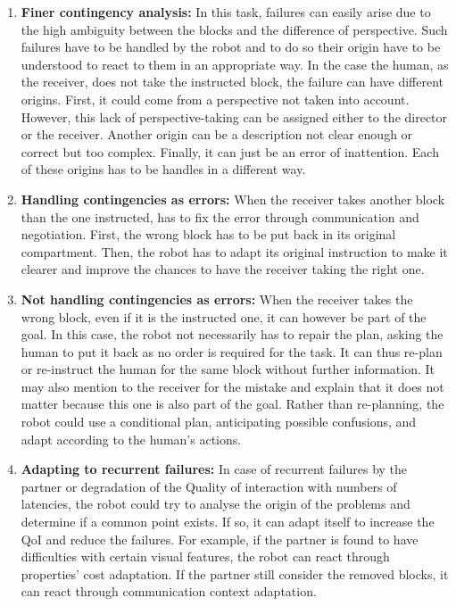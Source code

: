 \begin{enumerate}

\item \textbf{Finer contingency analysis:} In this task, failures can easily arise due to the high ambiguity between the blocks and the difference of perspective. Such failures have to be handled by the robot and to do so their origin have to be understood to react to them in an appropriate way. In the case the human, as the receiver, does not take the instructed block, the failure can have different origins. First, it could come from a perspective not taken into account. However, this lack of perspective-taking can be assigned either to the director or the receiver. Another origin can be a description not clear enough or correct but too complex. Finally, it can just be an error of inattention. Each of these origins has to be handles in a different way. \label{chal:cont_analysis}

\item \textbf{Handling contingencies as errors:} When the receiver takes another block than the one instructed, has to fix the error through communication and negotiation. First, the wrong block has to be put back in its original compartment. Then, the robot has to adapt its original instruction to make it clearer and improve the chances to have the receiver taking the right one.\label{chal:cont_errors}

\item \textbf{Not handling contingencies as errors:} When the receiver takes the wrong block, even if it is the instructed one, it can however be part of the goal. In this case, the robot not necessarily has to repair the plan, asking the human to put it back as no order is required for the task. It can thus re-plan or re-instruct the human for the same block without further information. It may also mention to the receiver for the mistake and explain that it does not matter because this one is also part of the goal. Rather than re-planning, the robot could use a conditional plan, anticipating possible confusions, and adapt according to the human's actions.\label{chal:cont_not_errors}

\item \textbf{Adapting to recurrent failures:} In case of recurrent failures by the partner or degradation of the Quality of interaction with numbers of latencies, the robot could try to analyse the origin of the problems and determine if a common point exists. If so, it can adapt itself to increase the QoI and reduce the failures. For example, if the partner is found to have difficulties with certain visual features, the robot can react through properties' cost adaptation. If the partner still consider the removed blocks, it can react through communication context adaptation.\label{chal:change}


\end{enumerate}
